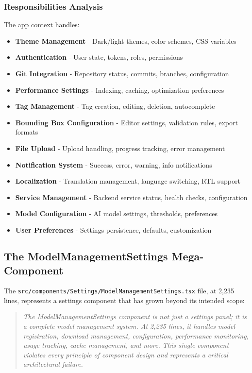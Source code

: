 \documentclass[11pt]{article}
\begin{document}
\subsubsection{Responsibilities Analysis}

The app context handles:

\begin{itemize}
\item \textbf{Theme Management} - Dark/light themes, color schemes, CSS variables
\item \textbf{Authentication} - User state, tokens, roles, permissions
\item \textbf{Git Integration} - Repository status, commits, branches, configuration
\item \textbf{Performance Settings} - Indexing, caching, optimization preferences
\item \textbf{Tag Management} - Tag creation, editing, deletion, autocomplete
\item \textbf{Bounding Box Configuration} - Editor settings, validation rules, export formats
\item \textbf{File Upload} - Upload handling, progress tracking, error management
\item \textbf{Notification System} - Success, error, warning, info notifications
\item \textbf{Localization} - Translation management, language switching, RTL support
\item \textbf{Service Management} - Backend service status, health checks, configuration
\item \textbf{Model Configuration} - AI model settings, thresholds, preferences
\item \textbf{User Preferences} - Settings persistence, defaults, customization
\end{itemize}

\subsection{The ModelManagementSettings Mega-Component}

The \texttt{src/components/Settings/ModelManagementSettings.tsx} file, at 2,235 lines, represents a settings component that has grown beyond its intended scope:

\begin{quote}
\emph{The ModelManagementSettings component is not just a settings panel; it is a complete model management system. At 2,235 lines, it handles model registration, download management, configuration, performance monitoring, usage tracking, cache management, and more. This single component violates every principle of component design and represents a critical architectural failure.}
\end{quote}
\end{document}
